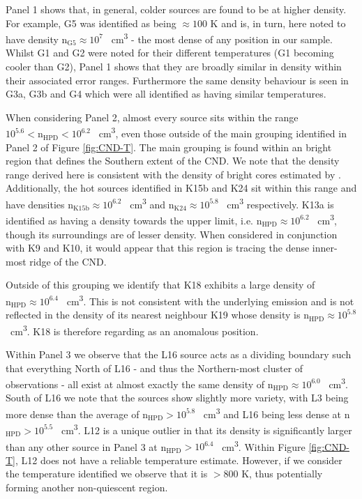 \documentclass[twocolumn]{aastex631}
\begin{document}
Panel 1 shows that, in general, colder sources are found to be at higher density. For example, G5 was identified as being $\approx 100$ \si{\kelvin} and is, in turn, here noted to have density n$_{\mathrm{G5}} \approx 10^{7}$ \si{\per\centi\meter\cubed} - the most dense of any position in our sample. Whilst G1 and G2 were noted for their different temperatures (G1 becoming cooler than G2), Panel 1 shows that they are broadly similar in density within their associated error ranges. Furthermore the same density behaviour is seen in G3a, G3b and G4 which were all identified as having similar temperatures. 

When considering Panel 2, almost every source sits within the range $10^{5.6} < \mathrm{n_{HPD}} < 10^{6.2}$ \si{\per\centi\meter\cubed}, even those outside of the main grouping identified in Panel 2 of Figure \ref{fig:CND-T}. The main grouping is found within an  bright region that defines the Southern extent of the CND. We note that the density range derived here is consistent with the density of  bright cores estimated by \citet{sgrAHCN}. Additionally, the hot sources identified in K15b and K24 sit within this range and have densities n$_{\mathrm{K15b}} \approx 10^{6.2}$ \si{\per\centi\meter\cubed} and n$_{\mathrm{K24}} \approx 10^{5.8}$ \si{\per\centi\meter\cubed} respectively. K13a is identified as having a density towards the upper limit, i.e. $\mathrm{n_{HPD}} \approx 10^{6.2}$ \si{\per\centi\meter\cubed}, though its surroundings are of lesser density. When considered in conjunction with K9 and K10, it would appear that this region is tracing the dense inner-most ridge of the CND.

Outside of this grouping we identify that K18 exhibits a large density of $\mathrm{n_{HPD}} \approx 10^{6.4}$ \si{\per\centi\meter\cubed}. This is not consistent with the underlying  emission and is not reflected in the density of its nearest neighbour K19 whose density is $\mathrm{n_{HPD}} \approx 10^{5.8}$ \si{\per\centi\meter\cubed}. K18 is therefore regarding as an anomalous position.

Within Panel 3 we observe that the L16 source acts as a dividing boundary such that everything North of L16 - and thus the Northern-most cluster of observations - all exist at almost exactly the same density of n$_{\mathrm{HPD}} \approx 10^{6.0}$ \si{\per\centi\meter\cubed}. South of L16 we note that the sources show slightly more variety, with L3 being more dense than the average of n$_{\mathrm{HPD}} > 10^{5.8}$ \si{\per\centi\meter\cubed} and L16 being less dense at n$_{\mathrm{HPD}} > 10^{5.5}$ \si{\per\centi\meter\cubed}. L12 is a unique outlier in that its density is significantly larger than any other source in Panel 3 at n$_{\mathrm{HPD}} > 10^{6.4}$ \si{\per\centi\meter\cubed}. Within Figure \ref{fig:CND-T}, L12 does not have a reliable temperature estimate. However, if we consider the temperature identified we observe that it is $> 800$ \si{\kelvin}, thus potentially forming another non-quiescent region. 
\end{document}
